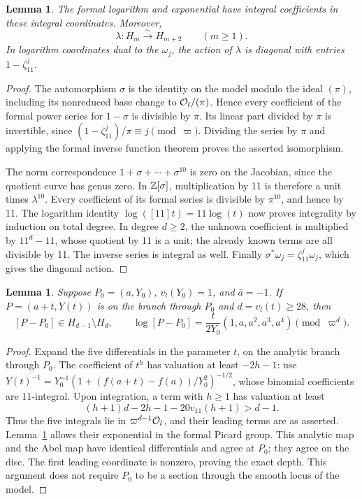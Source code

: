 \documentclass[11pt]{article}
\newtheorem{lemma}[theorem]{Lemma}
\begin{document}
\begin{lemma}\label{lem:log}
The formal logarithm and exponential have integral coefficients in
these integral coordinates. Moreover,
\[
 \lambda:H_m\xrightarrow{\sim}H_{m+2}\qquad(m\ge1).
\]
In logarithm coordinates dual to the \(\omega_j\), the action of
\(\lambda\) is diagonal with entries \(1-\zeta_{11}^j\).
\end{lemma}
\begin{proof}
The automorphism \(\sigma\) is the identity on the model modulo the
ideal \((\pi)\), including its nonreduced base change to
\(\mathcal O_l/(\pi)\). Hence every coefficient of the formal power series
for \(1-\sigma\) is divisible by \(\pi\). Its linear part divided by
\(\pi\) is invertible, since
\((1-\zeta_{11}^j)/\pi\equiv j\pmod\varpi\).
Dividing the series by \(\pi\) and applying the formal inverse
function theorem proves the asserted isomorphism.

The norm correspondence \(1+\sigma+\cdots+\sigma^{10}\) is zero on
the Jacobian, since the quotient curve has genus zero. In
\(\mathbb Z[\sigma]\), multiplication by 11 is therefore a unit times
\(\lambda^{10}\). Every coefficient of its formal series is divisible
by \(\pi^{10}\), and hence by 11.
The logarithm identity
\(\log([11]t)=11\log(t)\) now proves integrality by induction on total
degree. In degree \(d\ge2\), the unknown coefficient is multiplied
by \(11^d-11\), whose quotient by 11 is a unit; the already known
terms are all divisible by 11. The inverse series is integral as well.
Finally \(\sigma^*\omega_j=\zeta_{11}^j\omega_j\), which gives the
diagonal action.
\end{proof}

\begin{lemma}\label{lem:singulardisc}
Suppose \(P_0=(a,Y_0)\), \(v_l(Y_0)=1\), and \(\bar a=-1\).
If \(P=(a+t,Y(t))\) is on the branch through \(P_0\) and
\(d=v_l(t)\ge28\), then
\[
 [P-P_0]\in H_{d-1}\setminus H_d,
 \qquad
 \log[P-P_0]=\frac{t}{2Y_0}(1,a,a^2,a^3,a^4)
                  \pmod{\varpi^d}.
\]
\end{lemma}
\begin{proof}
Expand the five differentials in the parameter \(t\), on the analytic
branch through \(P_0\). The coefficient of \(t^h\) has valuation at
least \(-2h-1\): use
\(Y(t)^{-1}=Y_0^{-1}(1+(f(a+t)-f(a))/Y_0^2)^{-1/2}\), whose binomial
coefficients are 11-integral. Upon integration, a term with \(h\ge1\)
has valuation at least
\[
 (h+1)d-2h-1-20v_{11}(h+1)>d-1.
\]
Thus the five integrals lie in \(\varpi^{d-1}\mathcal O_l\), and their
leading terms are as asserted. Lemma~\ref{lem:log} allows their
exponential in the formal Picard group. This analytic map and the Abel
map have identical differentials and agree at \(P_0\); they agree on
the disc. The first leading coordinate is nonzero, proving the exact
depth. This argument does not require \(P_0\) to be a section through
the smooth locus of the model.
\end{proof}
\end{document}

